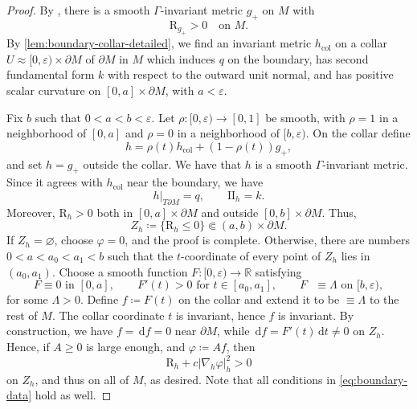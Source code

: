 \documentclass[11pt]{amsart}
\numberwithin{equation}{section}
\newcommand{\dd}{\,\mathrm d}
\newcommand{\scal}{\mathrm{R}}
\let\geq\geqslant
\let\leq\leqslant
\begin{document}
\begin{proof}
By \cite[Theorem I]{BaerHankeLocalFlexibility}, there is a smooth $\Gamma$-invariant metric $g_+$ on $M$ with
\[
  \scal_{g_+}>0\quad\text{on }M.
\]
By \cref{lem:boundary-collar-detailed}, we find an invariant metric
$h_{\mathrm{col}}$ on a collar $U \approx [0,\varepsilon)\times \partial M$ of $\partial M$ in $M$ which induces $q$ on the boundary, has
second fundamental form $k$ with respect to the outward unit normal, and has positive scalar curvature on $[0,a]\times \partial M $, with $a<\varepsilon$.

Fix $b$ such that $0<a<b<\varepsilon$.
Let
$\rho:[0,\varepsilon)\to[0,1]$ be smooth, with $\rho=1$ in a neighborhood of $[0,a]$
and $\rho=0$ in a neighborhood of $[b,\varepsilon)$.  On the collar define
\begin{equation}\label{eq:boundary-interpolation}
  h=\rho(t)h_{\mathrm{col}}+(1-\rho(t))g_+,
\end{equation}
and set $h=g_+$ outside the collar. We have that $h$ is a
smooth $\Gamma$-invariant metric. Since it agrees with $h_{\mathrm{col}}$ near the
boundary, we have
\[
  h|_{T\partial M}=q,
  \qquad \mathrm{II}_h=k.
\]
Moreover, $\scal_h>0$ both in $[0,a]\times\partial M$ and outside $[0,b]\times\partial M$.  Thus,
\[
  Z_h\coloneqq \{\scal_h\leq0\}\Subset (a,b)\times\partial M.
\]
If $Z_h=\varnothing$, choose $\varphi=0$, and the proof is complete. Otherwise, there are numbers $
  0<a<a_0<a_1<b$
such that the $t$-coordinate of every point of $Z_h$ lies in
$(a_0,a_1)$.  Choose a smooth function
$F:[0,\varepsilon)\to\mathbb R$ satisfying
\[
  F\equiv 0\text{ in $[0,a]$},
  \qquad F'(t)>0\text{ for }t\in[a_0,a_1],
  \qquad F\text{ $\equiv\Lambda$ on }[b,\varepsilon),
\]
for some $\Lambda>0$.
Define $f\coloneqq F(t)$ on the collar and extend it to be $\equiv \Lambda$ to
the rest of $M$.  The collar coordinate $t$ is invariant, hence $f$ is
invariant.  By construction, we have
  $f=\dd f=0$ near $\partial M$, while
$
  \dd f=F'(t)\dd t\neq0
$
on $Z_h$.  Hence, if $A\geq 0$ is large enough, and
$\varphi\coloneqq Af$, then
\[
  \scal_h+c|\nabla_h\varphi|_h^2>0
\]
on $Z_h$, and thus on all of $M$, as desired. Note that all conditions in \eqref{eq:boundary-data} hold as well.
\end{proof}
\end{document}
